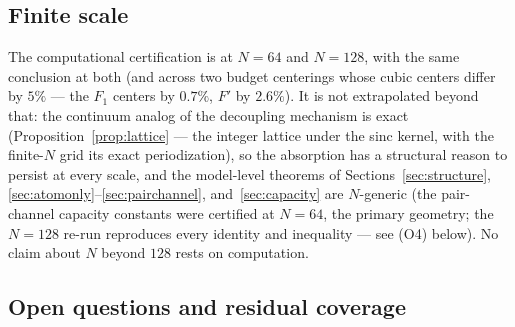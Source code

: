 \documentclass[11pt]{article}
\theoremstyle{plain}
\theoremstyle{definition}
\theoremstyle{remark}
\begin{document}
\subsection{Finite scale}

The computational certification is at $N = 64$ and $N = 128$, with the same
conclusion at both (and across two budget centerings whose cubic centers differ
by $5\%$ --- the $F_1$ centers by $0.7\%$, $F'$ by $2.6\%$). It is not
extrapolated beyond that: the continuum analog of the decoupling mechanism is
exact (Proposition~\ref{prop:lattice} --- the integer lattice under the sinc
kernel, with the finite-$N$ grid its exact periodization), so the absorption has
a structural reason to persist at every scale, and the model-level theorems of
Sections~\ref{sec:structure},
\ref{sec:atomonly}--\ref{sec:pairchannel}, and~\ref{sec:capacity} are
$N$-generic (the pair-channel capacity constants were certified at $N = 64$, the
primary geometry; the $N = 128$ re-run
reproduces every identity and inequality --- see (O4) below). No claim about $N$
beyond $128$ rests on computation.

\subsection{Open questions and residual coverage}
\label{sec:flags}
\end{document}
